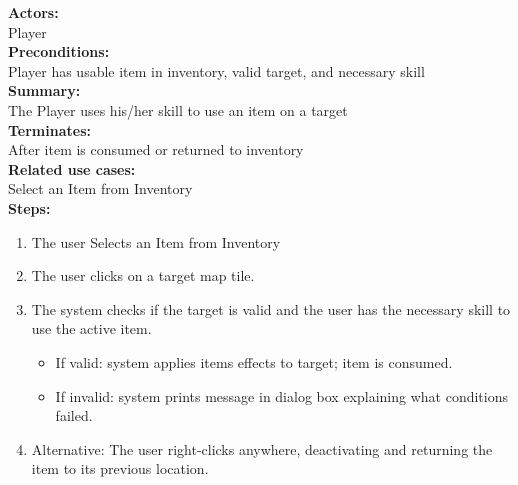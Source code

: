 \documentclass[12pt]{article}
\begin{document}
\textbf{Actors:} \hfil \\ \indent Player \\
\textbf{Preconditions:} \hfil \\ \indent Player has usable item in inventory, valid target, and necessary skill \\
\textbf{Summary:} \hfil \\ \indent The Player uses his/her skill to use an item on a target \\
\textbf{Terminates:} \hfil \\ \indent After item is consumed or returned to inventory \\
\textbf{Related use cases:} \hfil \\ \indent Select an Item from Inventory \\
\textbf{Steps:}

\begin{enumerate}
	\item The user Selects an Item from Inventory
	\item The user clicks on a target map tile.
	\item The system checks if the target is valid and the user has the necessary skill to use the active item.
	\begin{itemize}
		\item If valid: system applies items effects to target; item is consumed.
		\item If invalid:  system prints message in dialog box explaining what conditions failed.
	\end{itemize}
	\item Alternative: The user right-clicks anywhere, deactivating and returning the item to its previous location.
\end{enumerate} 

\hfil \linebreak
\end{document}
